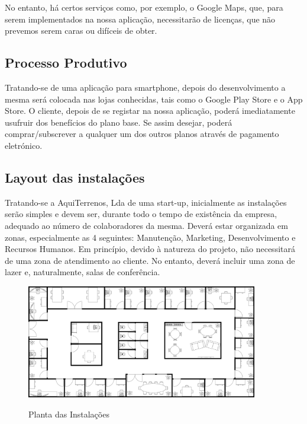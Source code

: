 \documentclass[11pt]{article}
\begin{document}
	No entanto, há certos serviços como, por exemplo, o Google Maps, que, para serem implementados na nossa aplicação, necessitarão de licenças, que não prevemos serem caras ou difíceis de obter.
	
	
	\large
	\subsection{Processo Produtivo}
	
	\normalsize
	
	Tratando-se de uma aplicação para smartphone, depois do desenvolvimento a mesma será colocada nas lojas conhecidas, tais como o Google Play Store e o App Store. O cliente, depois de se registar na nossa aplicação, poderá imediatamente usufruir dos benefícios do plano base. Se assim desejar, poderá comprar/subscrever a qualquer um dos outros planos através de pagamento eletrónico.
	
	
	\large
	\subsection{Layout das instalações}
	
	\normalsize
	
	Tratando-se a AquiTerrenos, Lda de uma start-up, inicialmente as instalações serão simples e devem ser, durante todo o tempo de existência da empresa, adequado ao número de colaboradores da mesma. Deverá estar organizada em zonas, especialmente as 4 seguintes: Manutenção, Marketing, Desenvolvimento e Recursos Humanos. Em princípio, devido à natureza do projeto, não necessitará de uma zona de atendimento ao cliente. No entanto, deverá incluir uma zona de lazer e, naturalmente, salas de conferência.
	
	\vspace{1cm}
	
	\begin{figure}[h]
		\includegraphics[width=0.9\textwidth,keepaspectratio]{planta}
		\label{fig:planta}
		\centering
		\caption{Planta das Instalações}
	\end{figure}
	
\end{document}
